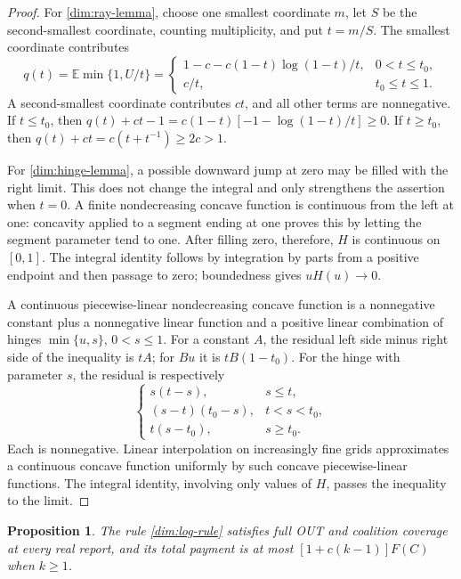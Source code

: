 \documentclass[11pt]{article}
\newcommand{\E}{\mathbb E}
\newtheorem{proposition}[theorem]{Proposition}
\theoremstyle{definition}\newtheorem{definition}[theorem]{Definition}
\theoremstyle{remark}\newtheorem{remark}[theorem]{Remark}
\begin{document}
\begin{proof}
For \eqref{dim:ray-lemma}, choose one smallest coordinate $m$, let $S$
be the second-smallest coordinate, counting multiplicity, and put $t=m/S$.
The smallest coordinate contributes
\[
 q(t)=\E\min\{1,U/t\}
 =\begin{cases}
 1-c-c(1-t)\log(1-t)/t,&0<t\le t_0,\\
 c/t,&t_0\le t\le1.
 \end{cases}
\]
A second-smallest coordinate contributes $ct$, and all other terms are
nonnegative. If $t\le t_0$, then
$q(t)+ct-1=c(1-t)[-1-\log(1-t)/t]\ge0$.
If $t\ge t_0$, then $q(t)+ct=c(t+t^{-1})\ge2c>1$.

For \eqref{dim:hinge-lemma}, a possible downward jump at zero may be
filled with the right limit. This does not change the integral and only
strengthens the assertion when $t=0$. A finite nondecreasing concave
function is continuous from the left at one: concavity applied to a segment
ending at one proves this by letting the segment parameter tend to one.
After filling zero, therefore, $H$ is continuous on $[0,1]$.
The integral identity follows by integration by parts from a positive
endpoint and then passage to zero; boundedness gives $uH(u)\to0$.

A continuous piecewise-linear nondecreasing concave function is a
nonnegative constant plus a nonnegative linear function and a positive
linear combination of hinges $\min\{u,s\}$, $0<s\le1$.
For a constant $A$, the residual left side minus right side of the
inequality is $tA$; for $Bu$ it is $tB(1-t_0)$.
For the hinge with parameter $s$, the residual is respectively
\[
 \begin{cases}
 s(t-s),&s\le t,\\
 (s-t)(t_0-s),&t<s<t_0,\\
 t(s-t_0),&s\ge t_0.
 \end{cases}
\]
Each is nonnegative. Linear interpolation on increasingly fine grids
approximates a continuous concave function uniformly by such concave
piecewise-linear functions. The integral identity, involving only values
of $H$, passes the inequality to the limit.
\end{proof}

\begin{proposition}\label{dim:out-upper}
The rule \eqref{dim:log-rule} satisfies full OUT and coalition coverage at
every real report, and its total payment is at most
$[1+c(k-1)]F(C)$ when $k\ge1$.
\end{proposition}
\end{document}
